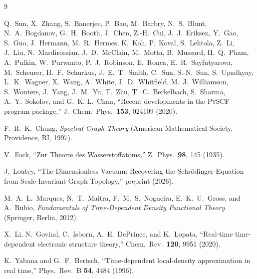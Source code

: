 \documentclass[aps,pra,twocolumn,superscriptaddress,longbibliography,floatfix]{revtex4-2}
\begin{document}
\begin{thebibliography}{9}

Q.~Sun, X.~Zhang, S.~Banerjee, P.~Bao, M.~Barbry, N.~S.~Blunt,
N.~A.~Bogdanov, G.~H.~Booth, J.~Chen, Z.-H.~Cui, J.~J.~Eriksen,
Y.~Gao, S.~Guo, J.~Hermann, M.~R.~Hermes, K.~Koh, P.~Koval,
S.~Lehtola, Z.~Li, J.~Liu, N.~Mardirossian, J.~D.~McClain,
M.~Motta, B.~Mussard, H.~Q.~Pham, A.~Pulkin, W.~Purwanto,
P.~J.~Robinson, E.~Ronca, E.~R.~Sayfutyarova, M.~Scheurer,
H.~F.~Schurkus, J.~E.~T.~Smith, C.~Sun, S.-N.~Sun, S.~Upadhyay,
L.~K.~Wagner, X.~Wang, A.~White, J.~D.~Whitfield, M.~J.~Williamson,
S.~Wouters, J.~Yang, J.~M.~Yu, T.~Zhu, T.~C.~Berkelbach,
S.~Sharma, A.~Y.~Sokolov, and G.~K.-L.~Chan,
``Recent developments in the \textsc{PySCF} program package,''
J.\ Chem.\ Phys.\ \textbf{153}, 024109 (2020).

F.~R.~K.~Chung,
\emph{Spectral Graph Theory}
(American Mathematical Society, Providence, RI, 1997).

V.~Fock,
``Zur Theorie des Wasserstoffatoms,''
Z.\ Phys.\ \textbf{98}, 145 (1935).

J.~Loutey,
``The Dimensionless Vacuum: Recovering the Schr\"{o}dinger Equation
from Scale-Invariant Graph Topology,''
preprint (2026).

M.~A.~L.~Marques, N.~T.~Maitra, F.~M.~S.~Nogueira, E.~K.~U.~Gross,
and A.~Rubio, \emph{Fundamentals of Time-Dependent Density Functional
Theory} (Springer, Berlin, 2012).

X.~Li, N.~Govind, C.~Isborn, A.~E.~DePrince, and K.~Lopata,
``Real-time time-dependent electronic structure theory,''
Chem.\ Rev.\ \textbf{120}, 9951 (2020).

K.~Yabana and G.~F.~Bertsch,
``Time-dependent local-density approximation in real time,''
Phys.\ Rev.\ B \textbf{54}, 4484 (1996).

\end{thebibliography}
\end{document}
